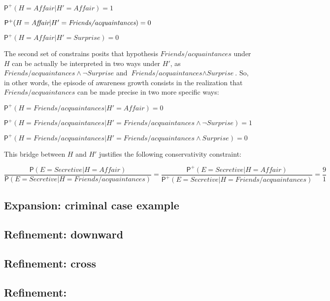 \documentclass[
  11pt,
  dvipsnames,enabledeprecatedfontcommands]{scrartcl}
\newcommand{\pr}[1]{\ensuremath{\mathsf{P}(#1)}}
\newcommand{\ppr}[2]{\ensuremath{\mathsf{P}^{#1}(#2)}}
\begin{document}
\(\ppr{+}{H=\textit{Affair} \vert H'=\textit{Affair}}=1\)

\(\ppr{+}{H=\textit{Affair} \vert H'=\textit{\textit{Friends/acquaintances}}}=0\)

\(\ppr{+}{H=\textit{Affair} \vert H'=\textit{Surprise}}=0\)

The second set of constrains posits that hypothesis
\(\textit{Friends/acquaintances}\) under \(H\) can be actually be
interpreted in two ways under \(H'\), as
\(\textit{Friends/acquaintances} \wedge \neg \textit{Surprise}\) and
\(\textit{Friends/acquaintances} \wedge \textit{Surprise}\). So, in
other words, the episode of awareness growth consists in the realization
that \(\textit{Friends/acquaintances}\) can be made precise in two more
specific ways:

\(\ppr{+}{H=\textit{Friends/acquaintances} \vert H'=\textit{Affair}}=0\)

\(\ppr{+}{H=\textit{Friends/acquaintances} \vert H'=\textit{Friends/acquaintances} \wedge \neg \textit{Surprise}}=1\)

\(\ppr{+}{H=\textit{Friends/acquaintances} \vert H'=\textit{Friends/acquaintances} \wedge \textit{Surprise}}=0\)

This bridge between \(H\) and \(H'\) justifies the following
conservativity constraint:

\[\frac{\pr{E=\textit{Secretive}\vert H=\textit{Affair}}}{\pr{E=\textit{Secretive}\vert H=\textit{Friends/acquaintances}}} = \frac{\ppr{+}{E=\textit{Secretive}\vert H=\textit{Affair}}}{\ppr{+}{E=\textit{Secretive}\vert H=\textit{Friends/acquaintances}}}=\frac{9}{1} \]

\hypertarget{expansion-criminal-case-example}{%
\subsection{Expansion: criminal case
example}\label{expansion-criminal-case-example}}

\hypertarget{refinement-downward}{%
\subsection{Refinement: downward}\label{refinement-downward}}

\hypertarget{refinement-cross}{%
\subsection{Refinement: cross}\label{refinement-cross}}

\hypertarget{refinement}{%
\subsection{Refinement:}\label{refinement}}
\end{document}
